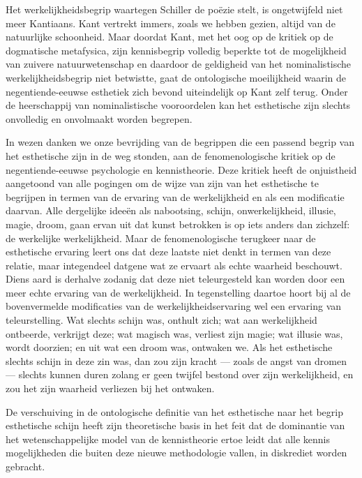 Het werkelijkheidsbegrip waartegen Schiller de poëzie stelt, is ongetwijfeld niet meer Kantiaans. Kant vertrekt immers, zoals we hebben gezien, altijd van de natuurlijke schoonheid. Maar doordat Kant, met het oog op de kritiek op de dogmatische metafysica, zijn kennisbegrip volledig beperkte tot de mogelijkheid van zuivere natuurwetenschap en daardoor de geldigheid van het nominalistische werkelijkheidsbegrip niet betwistte, gaat de ontologische moeilijkheid waarin de negentiende-eeuwse esthetiek zich bevond uiteindelijk op Kant zelf terug. Onder de heerschappij van nominalistische vooroordelen kan het esthetische zijn slechts onvolledig en onvolmaakt worden begrepen.

In wezen danken we onze bevrijding van de begrippen die een passend begrip van het esthetische zijn in de weg stonden, aan de fenomenologische kritiek op de negentiende-eeuwse psychologie en kennistheorie. Deze kritiek heeft de onjuistheid aangetoond van alle pogingen om de wijze van zijn van het esthetische te begrijpen in termen van de ervaring van de werkelijkheid en als een modificatie daarvan. Alle dergelijke ideeën als nabootsing, schijn, onwerkelijkheid, illusie, magie, droom, gaan ervan uit dat kunst betrokken is op iets anders dan zichzelf: de werkelijke werkelijkheid. Maar de fenomenologische terugkeer naar de esthetische ervaring leert ons dat deze laatste niet denkt in termen van deze relatie, maar integendeel datgene wat ze ervaart als echte waarheid beschouwt. Diens aard is derhalve zodanig dat deze niet teleurgesteld kan worden door een meer echte ervaring van de werkelijkheid. In tegenstelling daartoe hoort bij al de bovenvermelde modificaties van de werkelijkheidservaring wel een ervaring van teleurstelling. Wat slechts schijn was, onthult zich; wat aan werkelijkheid ontbeerde, verkrijgt deze; wat magisch was, verliest zijn magie; wat illusie was, wordt doorzien; en uit wat een droom was, ontwaken we. Als het esthetische slechts schijn in deze zin was, dan zou zijn kracht — zoals de angst van dromen — slechts kunnen duren zolang er geen twijfel bestond over zijn werkelijkheid, en zou het zijn waarheid verliezen bij het ontwaken.

De verschuiving in de ontologische definitie van het esthetische naar het begrip esthetische schijn heeft zijn theoretische basis in het feit dat de dominantie van het wetenschappelijke model van de kennistheorie ertoe leidt dat alle kennis mogelijkheden die buiten deze nieuwe methodologie vallen, in diskrediet worden gebracht.


